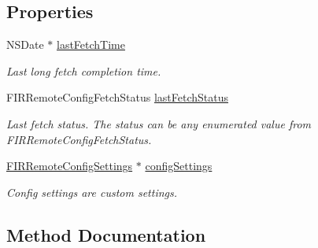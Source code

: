 \subsection*{Properties}
\begin{DoxyCompactItemize}
\item 
\hypertarget{interface_f_i_r_remote_config_a6f2f0b9cba221985a57521efb478e689}{}N\+S\+Date $\ast$ \hyperlink{interface_f_i_r_remote_config_a6f2f0b9cba221985a57521efb478e689}{last\+Fetch\+Time}\label{interface_f_i_r_remote_config_a6f2f0b9cba221985a57521efb478e689}

\begin{DoxyCompactList}\small\item\em Last long fetch completion time. \end{DoxyCompactList}\item 
\hypertarget{interface_f_i_r_remote_config_ac3e229702dae6daf6cdb6b00574f99a2}{}F\+I\+R\+Remote\+Config\+Fetch\+Status \hyperlink{interface_f_i_r_remote_config_ac3e229702dae6daf6cdb6b00574f99a2}{last\+Fetch\+Status}\label{interface_f_i_r_remote_config_ac3e229702dae6daf6cdb6b00574f99a2}

\begin{DoxyCompactList}\small\item\em Last fetch status. The status can be any enumerated value from F\+I\+R\+Remote\+Config\+Fetch\+Status. \end{DoxyCompactList}\item 
\hypertarget{interface_f_i_r_remote_config_af50146e21daa7a3b976b61b4a115fe37}{}\hyperlink{interface_f_i_r_remote_config_settings}{F\+I\+R\+Remote\+Config\+Settings} $\ast$ \hyperlink{interface_f_i_r_remote_config_af50146e21daa7a3b976b61b4a115fe37}{config\+Settings}\label{interface_f_i_r_remote_config_af50146e21daa7a3b976b61b4a115fe37}

\begin{DoxyCompactList}\small\item\em Config settings are custom settings. \end{DoxyCompactList}\end{DoxyCompactItemize}


\subsection{Method Documentation}
\hypertarget{interface_f_i_r_remote_config_ac0638d81208dba93c5fa5b539268bbcc}{}
